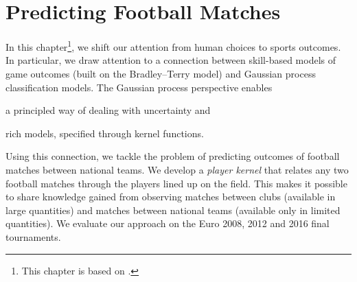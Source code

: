 \chapter{Predicting Football Matches}
\label{ch:playerkern}

In this chapter\footnote{%
This chapter is based on \citet*{maystre2016player}.},
we shift our attention from human choices to sports outcomes.
In particular, we draw attention to a connection between skill-based models of game outcomes (built on the Bradley--Terry model) and Gaussian process classification models.
The Gaussian process perspective enables
\begin{enuminline}
\item a principled way of dealing with uncertainty and
\item rich models, specified through kernel functions.
\end{enuminline}
Using this connection, we tackle the problem of predicting outcomes of football matches between national teams.
We develop a \emph{player kernel} that relates any two football matches through the players lined up on the field.
This makes it possible to share knowledge gained from observing matches between clubs (available in large quantities) and matches between national teams (available only in limited quantities).
We evaluate our approach on the Euro 2008, 2012 and 2016 final tournaments.







